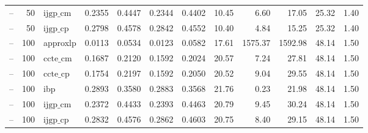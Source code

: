 \begin{table}[ht]
\begin{tabular}{lrlrrrrrrrrr}
-- & 50 & $\text{ijgp\_cm}$ & 0.2355 & 0.4447 & 0.2344 & 0.4402 & 10.45 & 6.60 & 17.05 & 25.32 & 1.40 \\
-- & 50 & $\text{ijgp\_cp}$ & 0.2798 & 0.4578 & 0.2842 & 0.4552 & 10.40 & 4.84 & 15.25 & 25.32 & 1.40 \\
-- & 100 & approxlp & 0.0113 & 0.0534 & 0.0123 & 0.0582 & 17.61 & 1575.37 & 1592.98 & 48.14 & 1.50 \\
-- & 100 & $\text{ccte\_cm}$ & 0.1687 & 0.2120 & 0.1592 & 0.2024 & 20.57 & 7.24 & 27.81 & 48.14 & 1.50 \\
-- & 100 & $\text{ccte\_cp}$ & 0.1754 & 0.2197 & 0.1592 & 0.2050 & 20.52 & 9.04 & 29.55 & 48.14 & 1.50 \\
-- & 100 & ibp & 0.2893 & 0.3580 & 0.2883 & 0.3568 & 21.76 & 0.23 & 21.98 & 48.14 & 1.50 \\
-- & 100 & $\text{ijgp\_cm}$ & 0.2372 & 0.4433 & 0.2393 & 0.4463 & 20.79 & 9.45 & 30.24 & 48.14 & 1.50 \\
-- & 100 & $\text{ijgp\_cp}$ & 0.2832 & 0.4576 & 0.2862 & 0.4603 & 20.75 & 8.40 & 29.15 & 48.14 & 1.50 \\
\bottomrule
\end{tabular}
\end{table}
